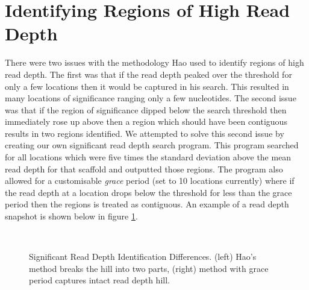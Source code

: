 \documentclass[12pt]{article}
\begin{document}
\section{Identifying Regions of High Read Depth}
	There were two issues with the methodology Hao used to identify regions of high read depth. The first was that if the read depth peaked over the threshold for only a few locations then it would be captured in his search. This resulted in many locations of significance ranging only a few nucleotides. The second issue was that if the region of significance dipped below the search threshold then immediately rose up above then a region which should have been contiguous results in two regions identified. We attempted to solve this second issue by creating our own significant read depth search program. This program searched for all locations which were five times the standard deviation above the mean read depth for that scaffold and outputted those regions. The program also allowed for a customisable \textit{grace} period (set to 10 locations currently) where if the read depth at a location drops below the threshold for less than the grace period then the regions is treated as contiguous. An example of a read depth snapshot is shown below in figure \ref{rdsnpstdevgrace}.
\begin{figure}[H]
	\begin{centering}
		\\
		\begin{singlespace}
			\vspace{-0.5cm}
			\caption[Significant Read Depth Identification Differences.]{Significant Read Depth Identification Differences. (left) Hao's method breaks the hill into two parts, (right) method with grace period captures intact read depth hill.}\label{rdsnpstdevgrace}
		\end{singlespace}
	\end{centering}
\end{figure}

%
%
\end{document}
